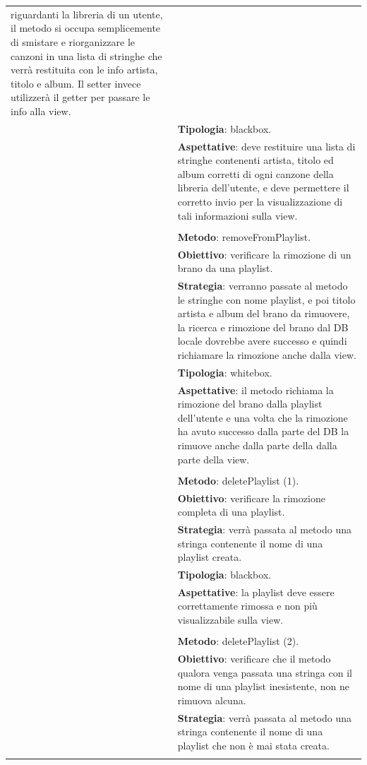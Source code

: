 \begin{footnotesize}
\begin{longtable}{|p{5.7cm}|p{10.3cm}|}
riguardanti la libreria di un utente, il metodo si occupa semplicemente di
smistare e riorganizzare le canzoni in una lista di stringhe che verr\`a
restituita con le info artista, titolo e album. Il setter invece utilizzer\`a
il getter per passare le info alla view.\\&
\textbf{Tipologia}: blackbox.\\&
\textbf{Aspettative}: deve
restituire una lista di stringhe contenenti artista, titolo ed album corretti di
ogni canzone della libreria dell'utente, e deve permettere il corretto invio per
la visualizzazione di tali informazioni sulla view.\\&
\\&
\textbf{Metodo}: removeFromPlaylist.\\&
\textbf{Obiettivo}: verificare la rimozione di un brano da una
playlist.\\& 
\textbf{Strategia}: verranno passate al metodo le stringhe con nome playlist,
e poi titolo artista e album del brano da rimuovere, la ricerca e rimozione
del brano dal DB locale dovrebbe avere successo e quindi richiamare la
rimozione anche dalla view.\\&
\textbf{Tipologia}: whitebox.\\&
\textbf{Aspettative}: il metodo richiama la
rimozione del brano dalla playlist dell'utente e una volta che la rimozione ha
avuto successo dalla parte del DB la rimuove anche dalla parte della dalla parte
della view.\\&
\\&
\textbf{Metodo}: deletePlaylist (1).\\&
\textbf{Obiettivo}: verificare la rimozione completa di una
playlist.\\& 
\textbf{Strategia}: verr\`a passata al metodo una stringa contenente il nome
di una playlist creata.\\& 
\textbf{Tipologia}: blackbox.\\&
\textbf{Aspettative}: la playlist deve essere correttamente rimossa e non
pi\`u visualizzabile sulla view.\\&
\\&
\textbf{Metodo}: deletePlaylist (2).\\&
\textbf{Obiettivo}: verificare che il metodo qualora venga passata
una stringa con il nome di una playlist inesistente, non ne rimuova alcuna.\\&
\textbf{Strategia}: verr\`a passata al metodo una stringa contenente il nome di
una playlist che non \`e mai stata creata.\\& 

\end{longtable}
\end{footnotesize}
